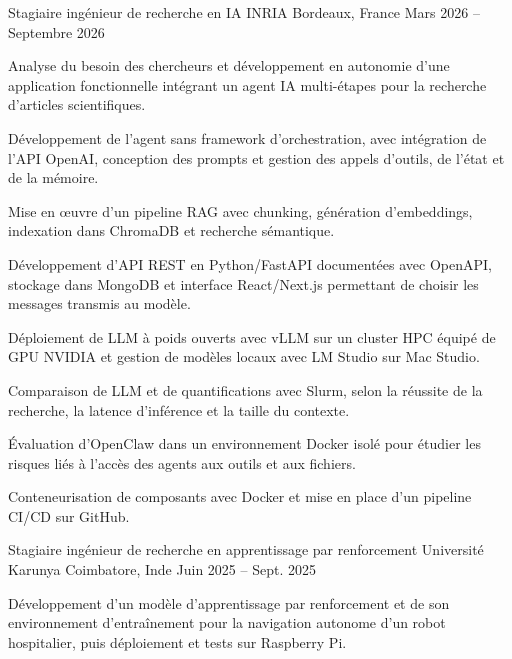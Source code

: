
\begin{cventries}
  \cventry
    {Stagiaire ingénieur de recherche en IA}
    {INRIA}
    {Bordeaux, France}
    {Mars 2026 -- Septembre 2026}
    {
      \begin{cvitems}
        \item {Analyse du besoin des chercheurs et développement en autonomie d’une application fonctionnelle intégrant un agent IA multi-étapes pour la recherche d’articles scientifiques.}
        \item {Développement de l’agent sans framework d’orchestration, avec intégration de l’API OpenAI, conception des prompts et gestion des appels d’outils, de l’état et de la mémoire.}
        \item {Mise en œuvre d’un pipeline RAG avec chunking, génération d’embeddings, indexation dans ChromaDB et recherche sémantique.}
        \item {Développement d’API REST en Python/FastAPI documentées avec OpenAPI, stockage dans MongoDB et interface React/Next.js permettant de choisir les messages transmis au modèle.}
        \item {Déploiement de LLM à poids ouverts avec vLLM sur un cluster HPC équipé de GPU NVIDIA et gestion de modèles locaux avec LM Studio sur Mac Studio.}
        \item {Comparaison de LLM et de quantifications avec Slurm, selon la réussite de la recherche, la latence d’inférence et la taille du contexte.}
        \item {Évaluation d’OpenClaw dans un environnement Docker isolé pour étudier les risques liés à l’accès des agents aux outils et aux fichiers.}
        \item {Conteneurisation de composants avec Docker et mise en place d’un pipeline CI/CD sur GitHub.}
      \end{cvitems}
    }

  \cventry
    {Stagiaire ingénieur de recherche en apprentissage par renforcement}
    {Université Karunya}
    {Coimbatore, Inde}
    {Juin 2025 -- Sept. 2025}
    {
      \begin{cvitems}
        \item {Développement d’un modèle d’apprentissage par renforcement et de son environnement d’entraînement pour la navigation autonome d’un robot hospitalier, puis déploiement et tests sur Raspberry Pi.}
      \end{cvitems}
    }
\end{cventries}

